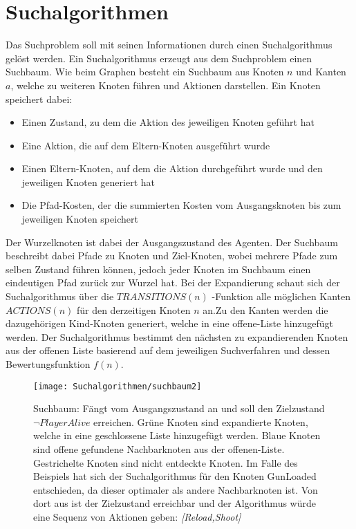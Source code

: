 \section{Suchalgorithmen}
Das Suchproblem soll mit seinen Informationen durch einen Suchalgorithmus gelöst werden. Ein Suchalgorithmus erzeugt aus dem Suchproblem einen Suchbaum. Wie beim Graphen besteht ein Suchbaum aus Knoten $n$ und Kanten $a$, welche zu weiteren Knoten führen und Aktionen darstellen. Ein Knoten speichert dabei:
\begin{itemize}
	\item Einen Zustand, zu dem die Aktion des jeweiligen Knoten geführt hat
	\item Eine Aktion, die auf dem Eltern-Knoten ausgeführt wurde
	\item Einen Eltern-Knoten, auf dem die Aktion durchgeführt wurde und den jeweiligen Knoten generiert hat
	\item Die Pfad-Kosten, der die summierten Kosten vom Ausgangsknoten bis zum jeweiligen Knoten speichert
\end{itemize}
Der Wurzelknoten ist dabei der Ausgangszustand des Agenten. Der Suchbaum beschreibt dabei Pfade zu Knoten und Ziel-Knoten, wobei mehrere Pfade zum selben Zustand führen können, jedoch jeder Knoten im Suchbaum einen eindeutigen Pfad zurück zur Wurzel hat.
Bei der Expandierung schaut sich der Suchalgorithmus über die $TRANSITIONS(n)$ -Funktion alle möglichen Kanten $ACTIONS(n)$ für den derzeitigen Knoten $n$ an.Zu den Kanten werden die dazugehörigen Kind-Knoten generiert, welche in eine offene-Liste hinzugefügt werden. Der Suchalgorithmus bestimmt den nächsten zu expandierenden Knoten aus der offenen Liste basierend auf dem jeweiligen Suchverfahren und dessen Bewertungsfunktion $f(n)$.

\begin{figure}[h]
  \centering
  \texttt{[image: Suchalgorithmen/suchbaum2]}
	\captionsetup{justification=justified, format=plain}
  \caption{Suchbaum: Fängt vom Ausgangszustand an und soll den Zielzustand $\lnot \textit{PlayerAlive}$ erreichen. Grüne Knoten sind expandierte Knoten, welche in eine geschlossene Liste hinzugefügt werden. Blaue Knoten sind offene gefundene Nachbarknoten aus der offenen-Liste. Gestrichelte Knoten sind nicht entdeckte Knoten. Im Falle des Beispiels hat sich der Suchalgorithmus für den Knoten GunLoaded entschieden, da dieser optimaler als andere Nachbarknoten ist. Von dort aus ist der Zielzustand erreichbar und der Algorithmus würde eine Sequenz von Aktionen geben: \textit{[Reload,Shoot]}}
  \label{Suchalgorithmen}
\end{figure}

